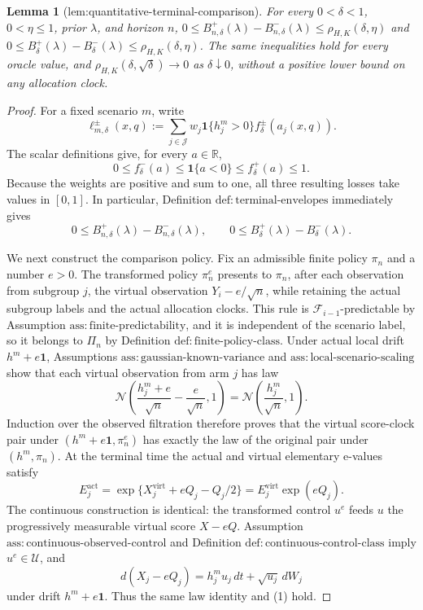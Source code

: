 \documentclass{article}
\newtheorem{lemma}{Lemma}
\begin{document}
\begin{lemma}[lem:quantitative-terminal-comparison]\label{lem:quantitative-terminal-comparison}
For every \(0<\delta<1\), \(0<\eta\leq1\), prior \(\lambda\), and horizon \(n\), \(0\leq B_{n,\delta}^+(\lambda)-B_{n,\delta}^-(\lambda)\leq\rho_{H,K}(\delta,\eta)\) and \(0\leq B_\delta^+(\lambda)-B_\delta^-(\lambda)\leq\rho_{H,K}(\delta,\eta)\). The same inequalities hold for every oracle value, and \(\rho_{H,K}(\delta,\sqrt\delta)\to0\) as \(\delta\downarrow0\), without a positive lower bound on any allocation clock.
\end{lemma}
\begin{proof}
For a fixed scenario \(m\), write
\[
\ell_{m,\delta}^{\pm}(x,q)
:=\sum_{j\in\mathcal J}w_j\mathbf 1\{h_j^m>0\}
 f_\delta^\pm(a_j(x,q)).
\]
The scalar definitions give, for every \(a\in\mathbb R\),
\[
0\leq f_\delta^-(a)\leq\mathbf 1\{a<0\}
\leq f_\delta^+(a)\leq1.
\]
Because the weights are positive and sum to one, all three resulting losses take values in \([0,1]\).  In particular, Definition \(\mathrm{def:terminal\text{-}envelopes}\) immediately gives
\[
0\leq B_{n,\delta}^+(\lambda)-B_{n,\delta}^-(\lambda),
\qquad
0\leq B_\delta^+(\lambda)-B_\delta^-(\lambda).
\]

We next construct the comparison policy.  Fix an admissible finite policy \(\pi_n\) and a number \(e>0\).  The transformed policy \(\pi_n^{e}\) presents to \(\pi_n\), after each observation from subgroup \(j\), the virtual observation \(Y_i-e/\sqrt n\), while retaining the actual subgroup labels and the actual allocation clocks.  This rule is \(\mathcal F_{i-1}\)-predictable by Assumption \(\mathrm{ass:finite\text{-}predictability}\), and it is independent of the scenario label, so it belongs to \(\Pi_n\) by Definition \(\mathrm{def:finite\text{-}policy\text{-}class}\).  Under actual local drift \(h^m+e\mathbf 1\), Assumptions \(\mathrm{ass:gaussian\text{-}known\text{-}variance}\) and \(\mathrm{ass:local\text{-}scenario\text{-}scaling}\) show that each virtual observation from arm \(j\) has law
\[
\mathcal N\!\left(\frac{h_j^m+e}{\sqrt n}-\frac e{\sqrt n},1\right)
=\mathcal N\!\left(\frac{h_j^m}{\sqrt n},1\right).
\]
Induction over the observed filtration therefore proves that the virtual score-clock pair under \((h^m+e\mathbf 1,\pi_n^e)\) has exactly the law of the original pair under \((h^m,\pi_n)\).  At the terminal time the actual and virtual elementary e-values satisfy
\[
E_j^{\mathrm{act}}
=\exp\{X_j^{\mathrm{virt}}+eQ_j-Q_j/2\}
=E_j^{\mathrm{virt}}\exp(eQ_j).
\tag{1}
\]
The continuous construction is identical: the transformed control \(u^e\) feeds \(u\) the progressively measurable virtual score \(X-eQ\).  Assumption \(\mathrm{ass:continuous\text{-}observed\text{-}control}\) and Definition \(\mathrm{def:continuous\text{-}control\text{-}class}\) imply \(u^e\in\mathcal U\), and
\[
d(X_j-eQ_j)=h_j^m u_j\,dt+\sqrt{u_j}\,dW_j
\]
under drift \(h^m+e\mathbf 1\).  Thus the same law identity and (1) hold.


\end{proof}
\end{document}
